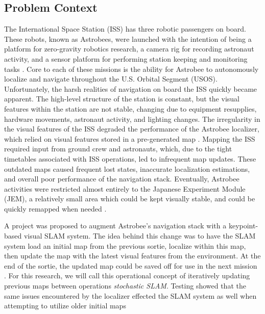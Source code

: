 \subsection{Problem Context}


The International Space Station (ISS) has three robotic passengers on board. These robots, known as Astrobees, were launched with the intention of being a platform for zero-gravity robotics research, a camera rig for recording astronaut activity, and a sensor platform for performing station keeping and monitoring tasks \cite{smithASTROBEENEWPLATFORM}. Core to each of these missions is the ability for Astrobee to autonomously localize and navigate throughout the U.S. Orbital Segment (USOS). Unfortunately, the harsh realities of navigation on board the ISS quickly became apparent. The high-level structure of the station is constant, but the visual features within the station are not stable, changing due to equipment resupplies, hardware movements, astronaut activity, and lighting changes. The irregularity in the visual features of the ISS degraded the performance of the Astrobee localizer, which relied on visual features stored in a pre-generated map \cite{soussanAstroLocEfficientRobust2022}. Mapping the ISS required input from ground crew and astronauts, which, due to the tight timetables associated with ISS operations, led to infrequent map updates. These outdated maps caused frequent lost states, inaccurate localization estimations, and overall poor performance of the navigation stack. Eventually, Astrobee activities were restricted almost entirely to the Japanese Experiment Module (JEM), a relatively small area which could be kept visually stable, and could be quickly remapped when needed \cite{carlinoLessonsLearnedAstrobee}.

A project was proposed to augment Astrobee's navigation stack with a keypoint-based visual SLAM system. The idea behind this change was to have the SLAM system load an initial map from the previous sortie, localize within this map, then update the map with the latest visual features from the environment. At the end of the sortie, the updated map could be saved off for use in the next mission \cite{zuralesCollaborativeSensingMapping2024}. For this research, we will call this operational concept of iteratively updating previous maps between operations \textit{stochastic SLAM}. Testing showed that the same issues encountered by the localizer effected the SLAM system as well when attempting to utilize older initial maps

